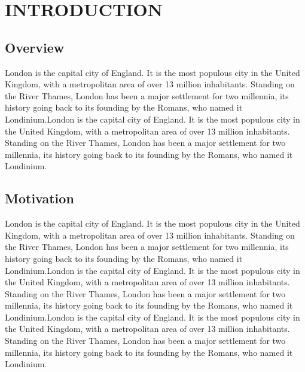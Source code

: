 \chapter{INTRODUCTION} 
\section{Overview}
London is the capital city of England. It is the most populous city in the United Kingdom, with a metropolitan area of over 13 million inhabitants. Standing on the River Thames, London has been a major settlement for two millennia, its history going back to its founding by the Romans, who named it Londinium.London is the capital city of England. It is the most populous city in the United Kingdom, with a metropolitan area of over 13 million inhabitants. Standing on the River Thames, London has been a major settlement for two millennia, its history going back to its founding by the Romans, who named it Londinium.

\section{Motivation}
London is the capital city of England. It is the most populous city in the United Kingdom, with a metropolitan area of over 13 million inhabitants. Standing on the River Thames, London has been a major settlement for two millennia, its history going back to its founding by the Romans, who named it Londinium.London is the capital city of England. It is the most populous city in the United Kingdom, with a metropolitan area of over 13 million inhabitants. Standing on the River Thames, London has been a major settlement for two millennia, its history going back to its founding by the Romans, who named it Londinium.London is the capital city of England. It is the most populous city in the United Kingdom, with a metropolitan area of over 13 million inhabitants. Standing on the River Thames, London has been a major settlement for two millennia, its history going back to its founding by the Romans, who named it Londinium.